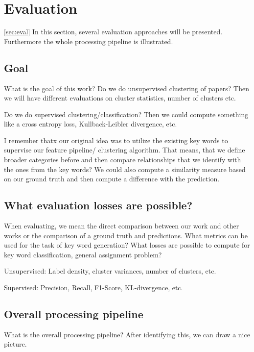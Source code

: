 \newpage %
\section{Evaluation}
\ref{sec:eval}
In this section, several evaluation approaches will be presented. Furthermore the whole processing pipeline is illustrated.

\subsection{Goal}
What is the goal of this work? Do we do unsupervised clustering of papers? Then we will have different evaluations on cluster statistics, number of clusters etc. 

Do we do supervised clustering/classification? Then we could compute something like a cross entropy loss, Kullback-Leibler divergence, etc.

I remember thatx our original idea was to utilize the existing key words to supervise our feature pipeline/ clustering algorithm. That means, that we define broader categories before and then compare relationships that we identify with the ones from the key words? We could also compute a similarity measure based on our ground truth and then compute a difference with the prediction.

\subsection{What evaluation losses are possible?}
When evaluating, we mean the direct comparison between our work and other works or the comparison of a ground truth and predictions. What metrics can be used for the task of key word generation? What losses are possible to compute for key word classification, general assignment problem?

Unsupervised: Label density, cluster variances, number of clusters, etc.

Supervised: Precision, Recall, F1-Score, KL-divergence, etc.

\subsection{Overall processing pipeline}
What is the overall processing pipeline? After identifying this, we can draw a nice picture. 


